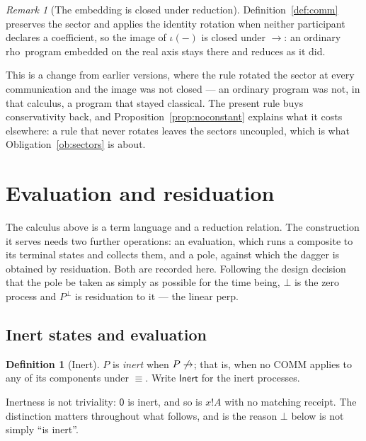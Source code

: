 \documentclass[11pt]{article}
\theoremstyle{definition}
\newtheorem{definition}[theorem]{Definition}
\theoremstyle{remark}
\newtheorem{remark}[theorem]{Remark}
\newcommand{\rhoc}{\textsf{rho}}
\newcommand{\pzero}{\mathsf{0}}
\newcommand{\scong}{\ensuremath{\equiv}}
\newcommand{\red}{\ensuremath{\rightarrow}}
\begin{document}
\begin{remark}[The embedding is closed under reduction]
\label{rem:notconservative}
Definition~\ref{def:comm} preserves the sector and applies the identity rotation
when neither participant declares a coefficient, so the image of $\iota(-)$ is
closed under $\red$: an ordinary \rhoc\ program embedded on the real axis stays
there and reduces as it did.

This is a change from earlier versions, where the rule rotated the sector at
every communication and the image was not closed --- an ordinary program was not,
in that calculus, a program that stayed classical. The present rule buys
conservativity back, and Proposition~\ref{prop:noconstant} explains what it costs
elsewhere: a rule that never rotates leaves the sectors uncoupled, which is what
Obligation~\ref{ob:sectors} is about.
\end{remark}

\section{Evaluation and residuation}
\label{sec:odot}

The calculus above is a term language and a reduction relation. The construction
it serves needs two further operations: an evaluation, which runs a composite to
its terminal states and collects them, and a pole, against which the dagger is
obtained by residuation. Both are recorded here. Following the design decision
that the pole be taken as simply as possible for the time being, $\bot$ is the
zero process and $P^{\perp}$ is residuation to it --- the linear perp.

\subsection{Inert states and evaluation}

\begin{definition}[Inert]
\label{def:inert}
$P$ is \emph{inert} when $P \not\red$; that is, when no COMM applies to any of
its components under $\scong$. Write $\mathsf{Inert}$ for the inert processes.
\end{definition}

Inertness is not triviality: $\pzero$ is inert, and so is $x!A$ with no matching
receipt. The distinction matters throughout what follows, and is the reason
$\bot$ below is not simply ``is inert''.
\end{document}
